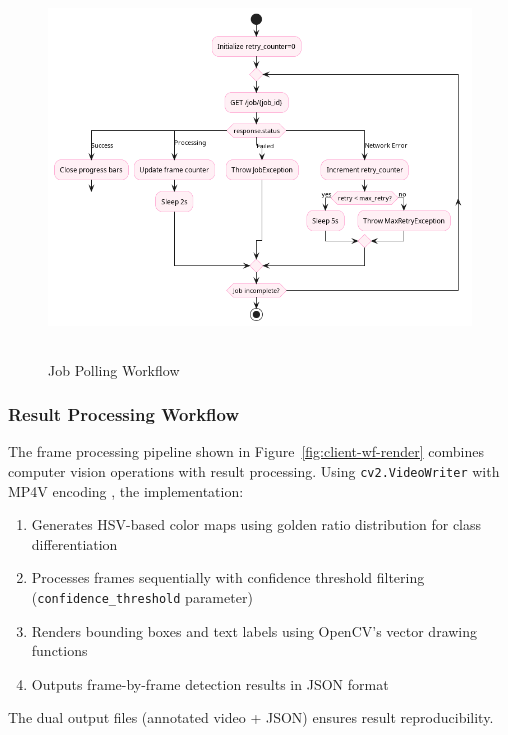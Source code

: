 \documentclass[10pt,a4paper]{article}
\begin{document}
\begin{figure}[htbp]
    \centering
    \includegraphics[height=10cm]{client-wf-polling.png}
    \caption{Job Polling Workflow}
    \label{fig:client-wf-polling}
\end{figure}

\subsubsection{Result Processing Workflow}
The frame processing pipeline shown in Figure~\ref{fig:client-wf-render} combines computer vision operations with result processing. Using \texttt{cv2.VideoWriter} with MP4V encoding \cite{opencv_docs}, the implementation:
\begin{enumerate}
    \item Generates HSV-based color maps using golden ratio distribution for class differentiation
    \item Processes frames sequentially with confidence threshold filtering (\texttt{confidence\_threshold} parameter)
    \item Renders bounding boxes and text labels using OpenCV's vector drawing functions
    \item Outputs frame-by-frame detection results in JSON format
\end{enumerate}
The dual output files (annotated video + JSON) ensures result reproducibility.
\end{document}
